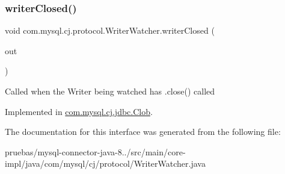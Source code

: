 \subsubsection{\texorpdfstring{writer\+Closed()}{writerClosed()}}
{\footnotesize\ttfamily void com.\+mysql.\+cj.\+protocol.\+Writer\+Watcher.\+writer\+Closed (\begin{DoxyParamCaption}\item[{\mbox{\hyperlink{classcom_1_1mysql_1_1cj_1_1protocol_1_1_watchable_writer}{Watchable\+Writer}}}]{out }\end{DoxyParamCaption})}

Called when the Writer being watched has .close() called 

Implemented in \mbox{\hyperlink{classcom_1_1mysql_1_1cj_1_1jdbc_1_1_clob_ab6d96b9b821f777e7b25850ceb480c2b}{com.\+mysql.\+cj.\+jdbc.\+Clob}}.



The documentation for this interface was generated from the following file\+:\begin{DoxyCompactItemize}
\item 
pruebas/mysql-\/connector-\/java-\/8../src/main/core-\/impl/java/com/mysql/cj/protocol/Writer\+Watcher.\+java\end{DoxyCompactItemize}

